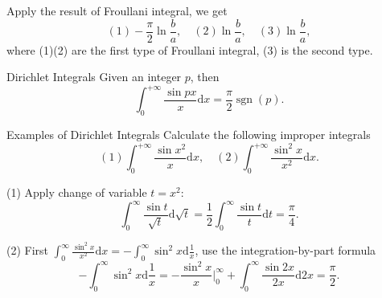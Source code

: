 \begin{solution}
  Apply the result of Froullani integral, we get 
  \begin{equation}
    (1) - \frac{\pi}{2} \ln \frac{b}{a}, \quad
    (2) \ln \frac{b}{a}, \quad
    (3) \ln \frac{b}{a},
  \end{equation}
  where (1)(2) are the first type of Froullani integral,
  (3) is the second type.
\end{solution}

\begin{theorem}{Dirichlet Integrals}{}
  Given an integer $p$, then
  \begin{equation}
    \int_0^{+\infty} \frac{\sin px}{x} \mathrm{d} x= \frac{\pi}{2} \operatorname{sgn}(p).
  \end{equation}
\end{theorem}

\begin{example}{Examples of Dirichlet Integrals}{}
  Calculate the following improper integrals
  \begin{equation}
    (1) \int_0^{+\infty} \frac{\sin x^2}{x}\mathrm{d} x, \quad
    (2) \int_0^{+\infty} \frac{\sin^2 x}{x^2} \mathrm{d} x.
  \end{equation}
\end{example}

\begin{solution}
  (1) Apply change of variable $t = x^2$:
  \begin{equation}
    \int_0^{\infty} \frac{\sin t}{\sqrt{t}}\mathrm{d} \sqrt{t}
    = \frac{1}{2} \int_0^{\infty} \frac{\sin t}{t}\mathrm{d} t
    = \frac{\pi}{4}.
  \end{equation}

  (2) First $\int_0^{\infty} \frac{\sin^2 x}{x^2}\mathrm{d} x =
  - \int_0^{\infty} \sin^2x \mathrm{d} \frac{1}{x}$, use the integration-by-part formula
  \begin{equation}
    - \int_0^{\infty} \sin^2 x \mathrm{d} \frac{1}{x}
    = - \frac{\sin^2 x}{x} \big|^{\infty}_0 + \int_0 ^{\infty} \frac{\sin 2x}{2x}\mathrm{d} 2x
    = \frac{\pi}{2}.
  \end{equation}
\end{solution}






